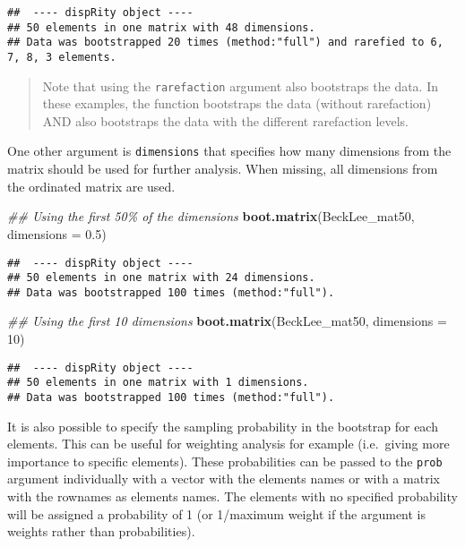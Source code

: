\documentclass[
]{book}
\newenvironment{Shaded}{\begin{snugshade}}{\end{snugshade}}
\newcommand{\CommentTok}[1]{\textcolor[rgb]{0.56,0.35,0.01}{\textit{#1}}}
\newcommand{\DataTypeTok}[1]{\textcolor[rgb]{0.13,0.29,0.53}{#1}}
\newcommand{\DecValTok}[1]{\textcolor[rgb]{0.00,0.00,0.81}{#1}}
\newcommand{\FloatTok}[1]{\textcolor[rgb]{0.00,0.00,0.81}{#1}}
\newcommand{\KeywordTok}[1]{\textcolor[rgb]{0.13,0.29,0.53}{\textbf{#1}}}
\newcommand{\NormalTok}[1]{#1}
\begin{document}
\begin{verbatim}
##  ---- dispRity object ---- 
## 50 elements in one matrix with 48 dimensions.
## Data was bootstrapped 20 times (method:"full") and rarefied to 6, 7, 8, 3 elements.
\end{verbatim}

\begin{quote}
Note that using the \texttt{rarefaction} argument also bootstraps the data. In these examples, the function bootstraps the data (without rarefaction) AND also bootstraps the data with the different rarefaction levels.
\end{quote}

One other argument is \texttt{dimensions} that specifies how many dimensions from the matrix should be used for further analysis.
When missing, all dimensions from the ordinated matrix are used.

\begin{Shaded}
\begin{Highlighting}[]
\CommentTok{\#\# Using the first 50\% of the dimensions}
\KeywordTok{boot.matrix}\NormalTok{(BeckLee\_mat50, }\DataTypeTok{dimensions =} \FloatTok{0.5}\NormalTok{)}
\end{Highlighting}
\end{Shaded}

\begin{verbatim}
##  ---- dispRity object ---- 
## 50 elements in one matrix with 24 dimensions.
## Data was bootstrapped 100 times (method:"full").
\end{verbatim}

\begin{Shaded}
\begin{Highlighting}[]
\CommentTok{\#\# Using the first 10 dimensions}
\KeywordTok{boot.matrix}\NormalTok{(BeckLee\_mat50, }\DataTypeTok{dimensions =} \DecValTok{10}\NormalTok{)}
\end{Highlighting}
\end{Shaded}

\begin{verbatim}
##  ---- dispRity object ---- 
## 50 elements in one matrix with 1 dimensions.
## Data was bootstrapped 100 times (method:"full").
\end{verbatim}

It is also possible to specify the sampling probability in the bootstrap for each elements.
This can be useful for weighting analysis for example (i.e.~giving more importance to specific elements).
These probabilities can be passed to the \texttt{prob} argument individually with a vector with the elements names or with a matrix with the rownames as elements names.
The elements with no specified probability will be assigned a probability of 1 (or 1/maximum weight if the argument is weights rather than probabilities).
\end{document}
